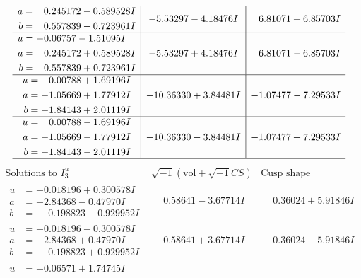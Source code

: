 \documentclass[1p]{elsarticle_modified}
\theoremstyle{definition}
\newcommand{\I}{\sqrt{-1}}
\begin{document}
$$\begin{array}{c|c|c}
\begin{aligned}
a &= \phantom{-}0.245172 - 0.589528 I \\
b &= \phantom{-}0.557839 - 0.723961 I\end{aligned}
 & -5.53297 - 4.18476 I & \phantom{-}6.81071 + 6.85703 I \\ \hline\begin{aligned}
u &= -0.06757 - 1.51095 I \\
a &= \phantom{-}0.245172 + 0.589528 I \\
b &= \phantom{-}0.557839 + 0.723961 I\end{aligned}
 & -5.53297 + 4.18476 I & \phantom{-}6.81071 - 6.85703 I \\ \hline\begin{aligned}
u &= \phantom{-}0.00788 + 1.69196 I \\
a &= -1.05669 + 1.77912 I \\
b &= -1.84143 + 2.01119 I\end{aligned}
 & -10.36330 + 3.84481 I & -1.07477 - 7.29533 I \\ \hline\begin{aligned}
u &= \phantom{-}0.00788 - 1.69196 I \\
a &= -1.05669 - 1.77912 I \\
b &= -1.84143 - 2.01119 I\end{aligned}
 & -10.36330 - 3.84481 I & -1.07477 + 7.29533 I\\
 \hline 
 \end{array}$$\newpage$$\begin{array}{c|c|c}  
\text{Solutions to }I^u_{3}& \I (\text{vol} + \sqrt{-1}CS) & \text{Cusp shape}\\
 \hline 
\begin{aligned}
u &= -0.018196 + 0.300578 I \\
a &= -2.84368 - 0.47970 I \\
b &= \phantom{-}0.198823 - 0.929952 I\end{aligned}
 & \phantom{-}0.58641 - 3.67714 I & \phantom{-}0.36024 + 5.91846 I \\ \hline\begin{aligned}
u &= -0.018196 - 0.300578 I \\
a &= -2.84368 + 0.47970 I \\
b &= \phantom{-}0.198823 + 0.929952 I\end{aligned}
 & \phantom{-}0.58641 + 3.67714 I & \phantom{-}0.36024 - 5.91846 I \\ \hline\begin{aligned}
u &= -0.06571 + 1.74745 I \\

\end{aligned}
\end{array}$$
\end{document}
